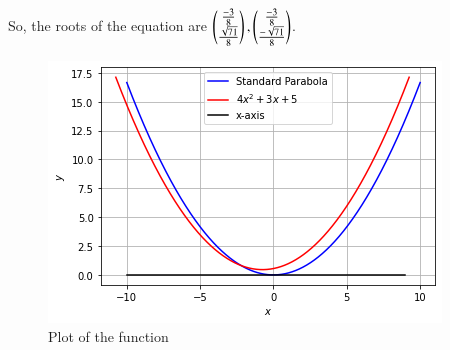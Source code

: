 So, the roots of the equation are $\begin{pmatrix}\frac{-3}{8} \\ \frac{\sqrt{71}}{8}\end{pmatrix}, \begin{pmatrix}\frac{-3}{8} \\ \frac{-\sqrt{71}}{8}\end{pmatrix}$.
\begin{figure}[htp]
    \centering
    \includegraphics[width=\columnwidth]{solutions/oct/2/19/Figures/Fig1.png}
    \caption{Plot of the function}
    \label{2/19/fig:plot}
\end{figure}
